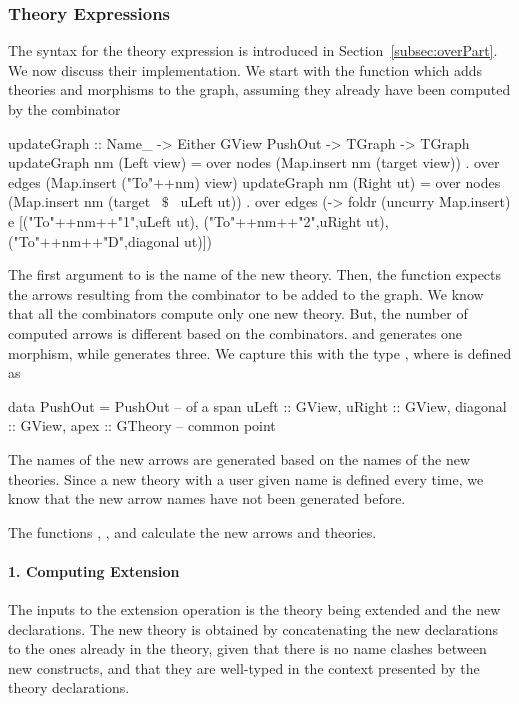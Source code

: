 \subsubsection{Theory Expressions}
The syntax for the theory expression is introduced in Section~\ref{subsec:overPart}. We now discuss their implementation. 
We start with the function  which adds theories and morphisms to the graph, assuming they already have been computed by the combinator
\begin{hscode}
updateGraph ::   Name_ -> Either GView PushOut -> TGraph -> TGraph
updateGraph nm (Left view) =
  over nodes (Map.insert nm (target view)) .
  over edges (Map.insert ("To"++nm) view)
updateGraph nm (Right ut) =
  over nodes (Map.insert nm (target ~$\$$~ uLeft ut)) .
  over edges (\e -> foldr (uncurry Map.insert) e 
                        [("To"++nm++"1",uLeft ut),
                         ("To"++nm++"2",uRight ut),
                         ("To"++nm++"D",diagonal ut)])
\end{hscode}
The first argument to  is the name of the new theory. Then, the function expects the arrows resulting from the combinator to be added to the graph. We know that all the combinators compute only one new theory. 
But, the number of computed arrows is different based on the combinators.  and  generates one morphism, while  generates three. We capture this with the type , where  is defined as 
\begin{hscode}
data PushOut = PushOut { -- of a span
  uLeft    :: GView,
  uRight   :: GView,
  diagonal :: GView,
  apex     :: GTheory } -- common point
\end{hscode}
The names of the new arrows are generated based on the names of the new theories. Since a new theory with a user given name is defined every time, we know that the new arrow names have not been generated before. 

The functions , , and  calculate the new arrows and theories. 

\paragraph{1. Computing Extension}
The inputs to the extension operation is the theory being extended and the new declarations. The new theory is obtained by concatenating the new declarations to the ones already in the theory, given that there is no name clashes between new constructs, and that they are well-typed in the context presented by the theory declarations. 

